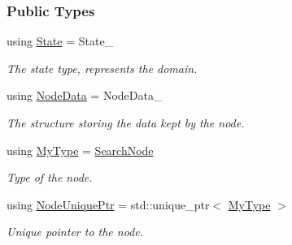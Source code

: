 \subsubsection*{Public Types}
\begin{DoxyCompactItemize}
\item 
using \hyperlink{structSearchNode_a2dcd6df22e4aa33cb18ef2fb6bd626c4}{State} = State\+\_\+\hypertarget{structSearchNode_a2dcd6df22e4aa33cb18ef2fb6bd626c4}{}\label{structSearchNode_a2dcd6df22e4aa33cb18ef2fb6bd626c4}

\begin{DoxyCompactList}\small\item\em The state type, represents the domain. \end{DoxyCompactList}\item 
using \hyperlink{structSearchNode_aa1ec7ef9bbe78e97fa020919485e0f26}{Node\+Data} = Node\+Data\+\_\+\hypertarget{structSearchNode_aa1ec7ef9bbe78e97fa020919485e0f26}{}\label{structSearchNode_aa1ec7ef9bbe78e97fa020919485e0f26}

\begin{DoxyCompactList}\small\item\em The structure storing the data kept by the node. \end{DoxyCompactList}\item 
using \hyperlink{structSearchNode_ad78b2656f529b6dd04b58957267cfed8}{My\+Type} = \hyperlink{structSearchNode}{Search\+Node}\hypertarget{structSearchNode_ad78b2656f529b6dd04b58957267cfed8}{}\label{structSearchNode_ad78b2656f529b6dd04b58957267cfed8}

\begin{DoxyCompactList}\small\item\em Type of the node. \end{DoxyCompactList}\item 
using \hyperlink{structSearchNode_ad819acc2f49b1bae1c5ced474b9af01f}{Node\+Unique\+Ptr} = std\+::unique\+\_\+ptr$<$ \hyperlink{structSearchNode_ad78b2656f529b6dd04b58957267cfed8}{My\+Type} $>$\hypertarget{structSearchNode_ad819acc2f49b1bae1c5ced474b9af01f}{}\label{structSearchNode_ad819acc2f49b1bae1c5ced474b9af01f}

\begin{DoxyCompactList}\small\item\em Unique pointer to the node. \end{DoxyCompactList}\end{DoxyCompactItemize}
